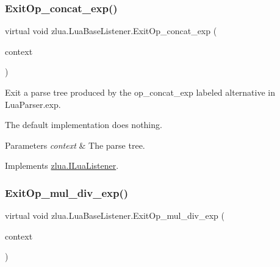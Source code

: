 \subsubsection{\texorpdfstring{Exit\+Op\+\_\+concat\+\_\+exp()}{ExitOp\_concat\_exp()}}
{\footnotesize\ttfamily virtual void zlua.\+Lua\+Base\+Listener.\+Exit\+Op\+\_\+concat\+\_\+exp (\begin{DoxyParamCaption}\item[{\mbox{[}\+Not\+Null\mbox{]} \mbox{\hyperlink{classzlua_1_1_lua_parser_1_1_op__concat__exp_context}{Lua\+Parser.\+Op\+\_\+concat\+\_\+exp\+Context}}}]{context }\end{DoxyParamCaption})\hspace{0.3cm}{\ttfamily [virtual]}}



Exit a parse tree produced by the {\ttfamily op\+\_\+concat\+\_\+exp} labeled alternative in Lua\+Parser.\+exp. 

The default implementation does nothing.


\begin{DoxyParams}{Parameters}
{\em context} & The parse tree.\\
\hline
\end{DoxyParams}


Implements \mbox{\hyperlink{interfacezlua_1_1_i_lua_listener_a5d79067d1b0d73aee302cf12972c0d4f}{zlua.\+I\+Lua\+Listener}}.

\mbox{\label{classzlua_1_1_lua_base_listener_ab89797d488c6f1700d00a8a609baf9f5}} 
\subsubsection{\texorpdfstring{Exit\+Op\+\_\+mul\+\_\+div\+\_\+exp()}{ExitOp\_mul\_div\_exp()}}
{\footnotesize\ttfamily virtual void zlua.\+Lua\+Base\+Listener.\+Exit\+Op\+\_\+mul\+\_\+div\+\_\+exp (\begin{DoxyParamCaption}\item[{\mbox{[}\+Not\+Null\mbox{]} \mbox{\hyperlink{classzlua_1_1_lua_parser_1_1_op__mul__div__exp_context}{Lua\+Parser.\+Op\+\_\+mul\+\_\+div\+\_\+exp\+Context}}}]{context }\end{DoxyParamCaption})\hspace{0.3cm}{\ttfamily [virtual]}}




